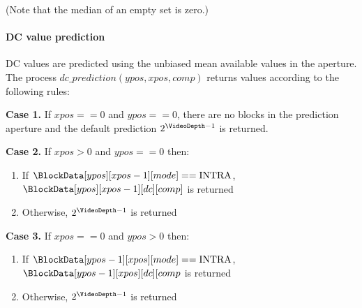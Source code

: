 \begin{pseudo*}
\bsIF{\BlockData[ypos][xpos-1][global]==\true}
    \bsIF{\BlockData[ypos][xpos-1][mode][ref]==\false}
    \bsEND
\bsEND
\bsIF{\BlockData[ypos-1][xpos][global]==\true}
    \bsIF{\BlockData[ypos-1][xpos][mode][ref]==\false}
    \bsEND
\bsEND
\bsIF{\BlockData[ypos-1][xpos-1][global]==\false}
    \bsIF{\BlockData[ypos-1][xpos-1][mode][ref]==\true}
    \bsEND
\bsEND


\end{pseudo*}

(Note that the median of an empty set is zero.)

\paragraph{DC value prediction \\}
\label{dcprediction}

DC values are predicted using the unbiased mean available values in the aperture. The
process $dc\_prediction(ypos, xpos, comp)$ returns values according to
the following rules:

{\bf Case 1.}  If $xpos==0$ and $ypos==0$, there are no blocks in the prediction aperture and
the default prediction $2^{\VideoDepth-1}$ is returned.

{\bf Case 2.} If $xpos>0$ and $ypos==0$ then:
\begin{enumerate}
   \item If $\BlockData[ypos][xpos-1][mode]==\Intra$, $\BlockData[ypos][xpos-1][dc][comp]$ is returned
   \item Otherwise, $2^{\VideoDepth-1}$ is returned
\end{enumerate}

{\bf Case 3.} If $xpos==0$ and $ypos>0$ then:
\begin{enumerate}
   \item If $\BlockData[ypos-1][xpos][mode]==\Intra$, $\BlockData[ypos-1][xpos][dc][comp$ is returned
   \item Otherwise, $2^{\VideoDepth-1}$ is returned
\end{enumerate}

